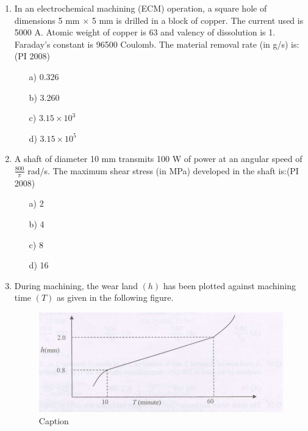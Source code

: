 \documentclass[journal,12pt,onecolumn]{IEEEtran}
\theoremstyle{remark}
\begin{document}
\begin{enumerate}
\item %
In an electrochemical machining (ECM) operation, a square hole of dimensions 5 mm $\times$ 5 mm is drilled in a block of copper. The current used is 5000 A. Atomic weight of copper is 63 and valency of dissolution is 1. Faraday's constant is 96500 Coulomb. The material removal rate (in g/s) is:\hfill{(PI 2008)}
\begin{multicols}{4}
    \begin{enumerate}
  \item[a)] 0.326
  \item[b)] 3.260
  \item[c)] \( 3.15 \times 10^3 \)
  \item[d)] \( 3.15 \times 10^5 \)
\end{enumerate}
\end{multicols}
\vspace{1cm}

\item %
A shaft of diameter 10 mm transmits 100 W of power at an angular speed of \( \frac{800}{\pi} \) rad/s. The maximum shear stress (in MPa) developed in the shaft is:\hfill{(PI 2008)}
\begin{multicols}{4}
    \begin{enumerate}
  \item[a)] 2
  \item[b)] 4
  \item[c)] 8
  \item[d)] 16
\end{enumerate}
\end{multicols}
\vspace{1cm}
\item %
During machining, the wear land $(h)$ has been plotted against machining time $(T)$ as given in the following figure. \\[2mm]

\begin{figure}[h]
    \centering
    \includegraphics[width=0.5\linewidth]{figures/GATE-pi-2008-51.png}
    \caption{Caption}
    \label{q53}
\end{figure}


\end{enumerate}
\end{document}
